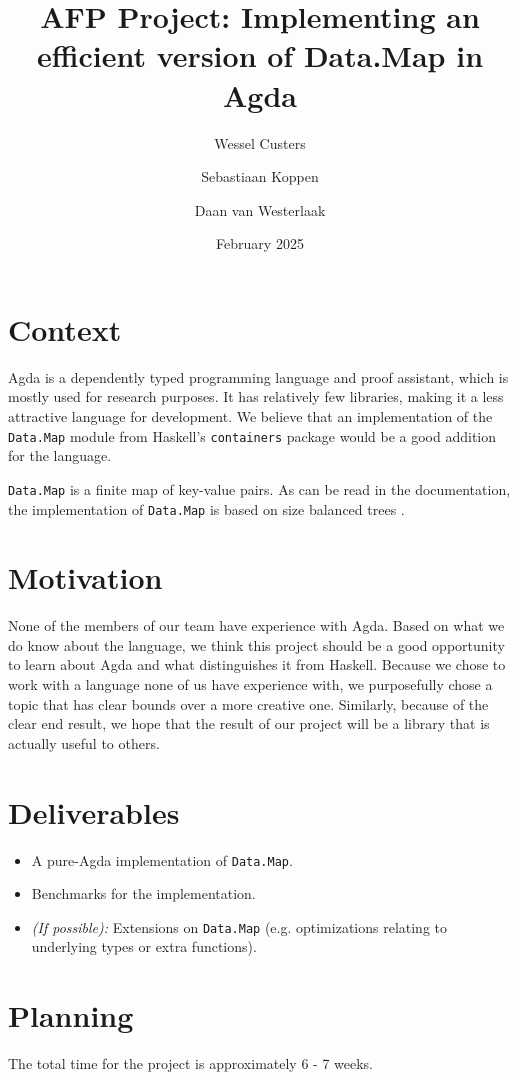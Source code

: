 \documentclass[a4paper,UKenglish,cleveref, autoref, thm-restate]{template/lipics-v2021}
\title{AFP Project: Implementing an efficient version of Data.Map in Agda}
\author{Wessel Custers}{Utrecht University, Netherlands}{}{}{}
\author{Sebastiaan Koppen}{Utrecht University, Netherlands}{}{}{}
\author{Daan van Westerlaak}{Utrecht University, Netherlands}{}{}{}
\date{February 2025}
\begin{document}
\maketitle

\section{Context}
Agda is a dependently typed programming language and proof assistant, which is mostly used for research purposes.
It has relatively few libraries, making it a less attractive language for development.
We believe that an implementation of the \texttt{Data.Map} module from Haskell's \texttt{containers} package would be a good addition for the language.

\texttt{Data.Map} is a finite map of key-value pairs. As can be read in the documentation, the implementation of \texttt{Data.Map} is based on size balanced trees \cite{adams1993functional, nievergelt1972binary}.

\section{Motivation}
None of the members of our team have experience with Agda. 
Based on what we do know about the language, we think this project should be a good opportunity to learn about Agda and what distinguishes it from Haskell.
Because we chose to work with a language none of us have experience with, we purposefully chose a topic that has clear bounds over a more creative one.
Similarly, because of the clear end result, we hope that the result of our project will be a library that is actually useful to others.

\section{Deliverables}
\begin{itemize}
    \item A pure-Agda implementation of \texttt{Data.Map}.
    \item Benchmarks for the implementation.
    \item \textit{(If possible):} Extensions on \texttt{Data.Map} (e.g. optimizations relating to underlying types or extra functions).
\end{itemize}

\section{Planning}
The total time for the project is approximately 6 - 7 weeks.
\end{document}
